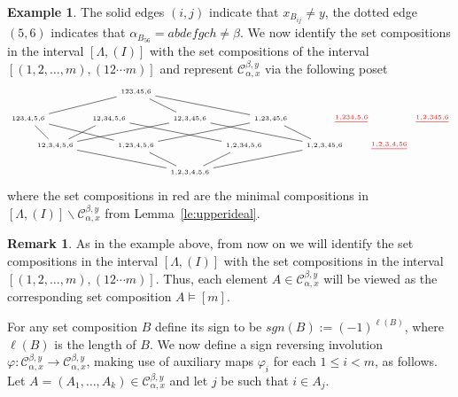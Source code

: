 \documentclass[10pt]{amsart}
\theoremstyle{definition}
\newtheorem{exam}[theorem]{Example}
\newtheorem{rema}[theorem]{Remark}
\newcommand{\red}[1]{\textcolor{red}{#1}}
\begin{document}
\begin{exam}
The solid edges $(i,j)$ indicate that $ x_{B_{ij}}\ne y$, the dotted edge $(5,6)$ indicates that $ \alpha_{B_{56}}=abdefgch\ne \beta$. 
We now identify the set compositions in the interval $[\Lambda,(I)]$ with the set compositions of the interval $[(1,2,\ldots,m),(12\cdots m)]$ 
and represent $\mathcal{C}_{\alpha,x}^{\beta,y}$ via the following poset
$$
\begin{tikzpicture}[scale=1.57,baseline=.5cm]
	\node (0) at (0,0) {$\scriptscriptstyle 1,2,3,4,5,6$};
	\node (12) at (-2.5,.5) {$\scriptscriptstyle 12,3,4,5,6$};
	\node (23) at (-1,.5) {$\scriptscriptstyle 1,23,4,5,6$};
	\node (34) at (1,.5) {$\scriptscriptstyle 1,2,34,5,6$};
	\node (45) at (2.5,.5) {$\scriptscriptstyle 1,2,3,45,6$};
	\node (56) at (3.7,.5) {$\scriptscriptstyle \red{\underline{1,2,3,4,56}}$};
	\draw (0) -- (12);
	\draw (0) -- (23);
	\draw (0) -- (34);
	\draw (0) -- (45);
	\node (123) at (-3,1) {$\scriptscriptstyle 123,4,5,6$};
	\node (12_34) at (-1.5,1) {$\scriptscriptstyle 12,34,5,6$};
	\node (12_45) at (0,1) {$\scriptscriptstyle 12,3,45,6$};
	\node (234) at (3,1) {$\scriptscriptstyle \red{\underline{1,234,5,6}}$};
	\node (23_45) at (1.5,1) {$\scriptscriptstyle 1,23,45,6$};
	\node (345) at (4.5,1) {$\scriptscriptstyle \red{\underline{1,2,345,6}}$};
	\draw (12)--(123);
	\draw (12)--(12_34);
	\draw (12)--(12_45);
	\draw (23)--(123);
	\draw (23)--(23_45);
	\draw (34)--(12_34);
	\draw (45)--(23_45);
	\draw (45)--(12_45);
	\node (123_45) at (-1,1.5) {$\scriptscriptstyle 123,45,6$};
	\draw (23_45)-- (123_45);
	\draw (123)--(123_45);
	\draw (12_45)--(123_45);
\end{tikzpicture} 
$$
where the set compositions in red are the minimal compositions in $[\Lambda,(I)] \backslash \mathcal{C}_{\alpha,x}^{\beta,y}$ from Lemma~\ref{le:upperideal}.
\end{exam}

\begin{rema}
As in the example above, from now on we will identify the set compositions in the interval $[\Lambda,(I)]$ with the set compositions in the interval $[(1,2,\ldots,m),(12\cdots m)]$.
Thus, each element $A\in \mathcal{C}_{\alpha,x}^{\beta,y}$ will be viewed as the corresponding set composition $A\models[m]$.
\end{rema}

For any set composition $B$ define its sign to be $sgn(B):=(-1)^{\ell (B)}$, where $\ell(B)$ is the length of $B$. We now define a sign reversing involution $\varphi\colon \mathcal{C}_{\alpha,x}^{\beta,y} \to \mathcal{C}_{\alpha,x}^{\beta,y}$, making use of auxiliary maps $\varphi _i$ for each $1\le i <m$, as follows.
Let $A=(A_1,\ldots,A_k)\in \mathcal{C}_{\alpha,x}^{\beta,y}$ and let $j$ be such that $i\in A_j$.
\end{document}
